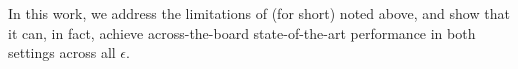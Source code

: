 \documentclass{article}
\begin{document}
In this work, we address the limitations of \MFFTRL (\MF for short) noted above, and show that it can, in fact, achieve across-the-board state-of-the-art performance in both settings across all $\epsilon$.
%
%
%

\end{document}
